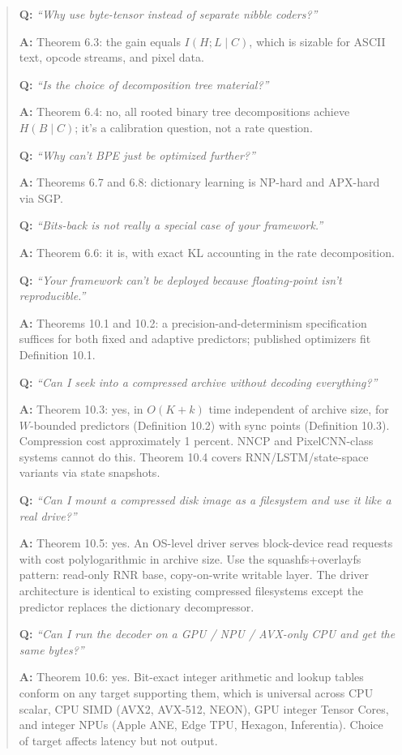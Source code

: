 \documentclass[
]{article}
\begin{document}
\begin{quote}
\textbf{Q:} \emph{``Why use byte-tensor instead of separate nibble
coders?''}

\textbf{A:} Theorem 6.3: the gain equals $I(H ; L \mid C)$, which
is sizable for ASCII text, opcode streams, and pixel data.

\textbf{Q:} \emph{``Is the choice of decomposition tree material?''}

\textbf{A:} Theorem 6.4: no, all rooted binary tree decompositions
achieve $H(B \mid C)$; it's a calibration question, not a rate
question.

\textbf{Q:} \emph{``Why can't BPE just be optimized further?''}

\textbf{A:} Theorems 6.7 and 6.8: dictionary learning is NP-hard
and APX-hard via SGP.

\textbf{Q:} \emph{``Bits-back is not really a special case of your
framework.''}

\textbf{A:} Theorem 6.6: it is, with exact KL accounting in the
rate decomposition.

\textbf{Q:} \emph{``Your framework can't be deployed because
floating-point isn't reproducible.''}

\textbf{A:} Theorems 10.1 and 10.2: a precision-and-determinism
specification suffices for both fixed and adaptive predictors;
published optimizers fit Definition 10.1.

\textbf{Q:} \emph{``Can I seek into a compressed archive without
decoding everything?''}

\textbf{A:} Theorem 10.3: yes, in $O(K + k)$ time independent of
archive size, for $W$-bounded predictors (Definition 10.2) with
sync points (Definition 10.3). Compression cost approximately 1
percent. NNCP and PixelCNN-class systems cannot do this. Theorem
10.4 covers RNN/LSTM/state-space variants via state snapshots.

\textbf{Q:} \emph{``Can I mount a compressed disk image as a filesystem
and use it like a real drive?''}

\textbf{A:} Theorem 10.5: yes. An OS-level driver serves block-device
read requests with cost polylogarithmic in archive size. Use the
squashfs+overlayfs pattern: read-only RNR base, copy-on-write writable
layer. The driver architecture is identical to existing compressed
filesystems except the predictor replaces the dictionary decompressor.

\textbf{Q:} \emph{``Can I run the decoder on a GPU / NPU / AVX-only CPU
and get the same bytes?''}

\textbf{A:} Theorem 10.6: yes. Bit-exact integer arithmetic and lookup
tables conform on any target supporting them, which is universal across
CPU scalar, CPU SIMD (AVX2, AVX-512, NEON), GPU integer Tensor Cores,
and integer NPUs (Apple ANE, Edge TPU, Hexagon, Inferentia). Choice of
target affects latency but not output.


\end{quote}
\end{document}
